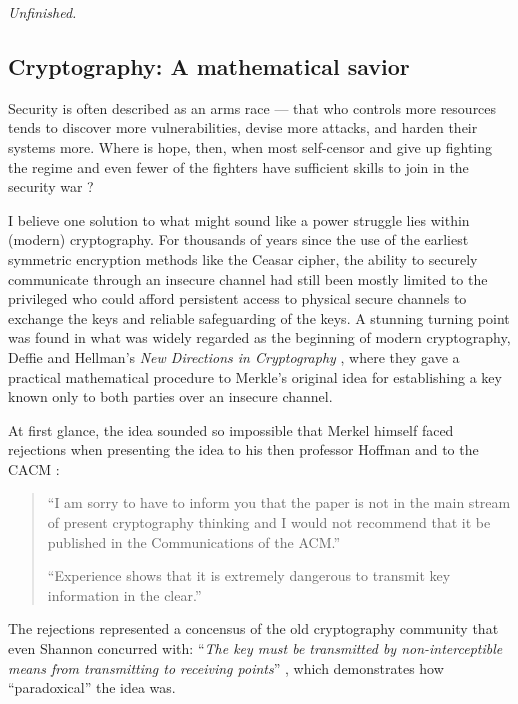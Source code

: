\documentclass[10pt]{article}
\begin{document}
\emph{Unfinished.}

\subsection[Cryptography]{Cryptography: A mathematical savior}
\label{sec.crypto}
Security is often described as an arms race --- that who controls more
resources tends to discover more vulnerabilities, devise more attacks, and
harden their systems more. Where is hope, then, when most self-censor and give
up fighting the regime \cite{self.censor.1, self.censor.2, self.censor.3}  and
even fewer of the fighters have sufficient skills to join in the security war
\cite{defenders.lack.skills.1, defenders.lack.skills.2}?

I believe one solution to what might sound like a power struggle lies within
(modern) cryptography. For thousands of years since the use of the earliest
symmetric encryption methods like the Ceasar cipher, the ability to securely
communicate through an insecure channel had still been mostly limited to the
privileged who could afford persistent access to physical secure channels to
exchange the keys and reliable safeguarding of the keys.  A stunning turning
point was found in what was widely regarded as the beginning of modern
cryptography, Deffie and Hellman's \emph{New Directions in Cryptography}
\cite{new.directions.crypto}, where they gave a practical mathematical
procedure to Merkle's original idea for establishing a key known only to both
parties over an insecure channel.

At first glance, the idea sounded so impossible that Merkel himself faced 
rejections when presenting the idea to his then professor Hoffman and to the
CACM \cite{merkle.rejection}:
\begin{quotation}
	``I am sorry to have to inform you that the paper is not in the main stream
	of present cryptography thinking and I would not recommend that it be
	published in the Communications of the ACM.''

	``Experience shows that it is extremely dangerous to transmit key
	information in the clear.''\cite{merkle.rejection}
\end{quotation}
The rejections represented a concensus of the old cryptography community that
even Shannon concurred with: ``\emph{The key must be transmitted by
non-interceptible means from transmitting to receiving points}''
\cite[p.~670]{shannon.theory.secrecy}, which demonstrates how ``paradoxical''
the idea was.
\end{document}

